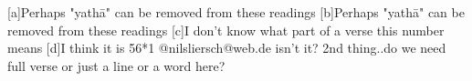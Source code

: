 




	

	

[a]Perhaps "yathā" can be removed from these readings
[b]Perhaps "yathā" can be removed from these readings
[c]I don't know what part of a verse this number means
[d]I think it is 56*1 @nilsliersch@web.de isn't it? 2nd thing..do we need full verse or just a line or a word here?